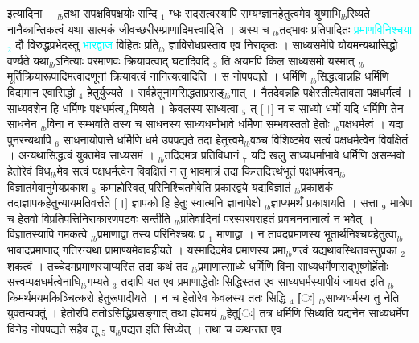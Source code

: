 \documentclass[article,12pt,a4paper]{memoir}%
\newcommand{\quotelemma}[1]{\textcolor{cyan}{#1}}
\begin{document}
	  
	  
	    \pstart  \leavevmode%
	    \hphantom{.}
	   इत्यादिना । {\tiny $_{lb}$}तथा सपक्षविपक्षयोः सन्दि {\tiny $_{1}$} ग्धः सदसत्वस्यापि सम्यग्ज्ञानहेतुत्वमेव युष्माभि{\tiny $_{lb}$}रिष्यते नानैकान्तिकत्वं यथा सात्मकं जीवच्छरीरम्प्राणादिमत्त्वादिति । अस्य च {\tiny $_{lb}$}तद्भावः प्रतिपादितः \quotelemma{प्रमाणविनिश्चया {\tiny $_{2}$}} दौ विरुद्धप्रभेदस्तु \quotelemma{भारद्वाज} विहितः प्रति{\tiny $_{lb}$} \leavevmode{} ज्ञाविरोधप्रस्ताव एव निराकृतः । साध्यसमेपि योयमन्यथासिद्धो वर्ण्यते यथा{\tiny $_{lb}$}ऽनित्याः परमाणवः क्रियावत्वाद् घटादिवदि {\tiny $_{3}$} ति अयमपि किल साध्यसमो यस्मात् {\tiny $_{lb}$}मूर्तिक्रियारूपादिमत्वादणूनां क्रियावत्वं नानित्यत्वादिति । स नोपपद्यते । धर्मिणि {\tiny $_{lb}$}सिद्धत्वान्नहि धर्मिणि विद्यमान एवासिद्धो {\tiny $_{4}$} हेतुर्युज्यते । सर्वहेतूनामसिद्धताप्रसङ्{\tiny $_{lb}$}गात् । नैतदेवन्नहि पक्षेस्तीत्येतावता पक्षधर्मत्वं । साध्यवशेन हि धर्मिणः पक्षधर्मत्व{\tiny $_{lb}$}मिष्यते । केवलस्य साध्यत्वा {\tiny $_{5}$} त् [।] न च साध्यो धर्मो यदि धर्मिणि तेन साधनेन {\tiny $_{lb}$}विना न सम्भवति तस्य च साधनस्य साध्यधर्माभावे धर्मिणा सम्भवस्ततो हेतोः {\tiny $_{lb}$}पक्षधर्मत्वं । यदा पुनरन्यथापि {\tiny $_{6}$} साधनायोपात्ते धर्मिणि धर्म उपपद्यते तदा हेतुत्त्वमे{\tiny $_{lb}$}वञ्च विशिष्टमेव सत्वं पक्षधर्मत्वेन विवक्षितं । अन्यथासिद्धत्वं युक्तमेव साध्यसमं । {\tiny $_{lb}$}तदिदमत्र प्रतिविधानं {\tiny $_{7}$} यदि खलु साध्यधर्माभावे धर्मिणि असम्भवो हेतोरेवं विध{\tiny $_{lb}$}मेव सत्वं पक्षधर्मत्वेन विवक्षितं न तु भावमात्रं तदा किन्तदित्त्थंभूतं पक्षधर्मत्वम{\tiny $_{lb}$}विज्ञातमेवानुमेयप्रकाश {\tiny $_{8}$} कमाहोस्वित् परिनिश्चितमेवेति प्रकारद्वये यद्यविज्ञातं {\tiny $_{lb}$}प्रकाशकं तदाज्ञापकहेतुन्यायमतिवर्त्तते [।] ज्ञापको हि हेतुः स्वात्मनि ज्ञानापेक्षो {\tiny $_{lb}$}ज्ञाप्यमर्थं प्रकाशयति । सत्ता {\tiny $_{9}$} \leavevmode{} मात्रेण च हेतवो विप्रतिपत्तिनिराकारणपटवः सन्तीति {\tiny $_{lb}$}प्रतिवादिनां परस्परपराहतं प्रवचननानात्वं न भवेत् । विज्ञातस्यापि गमकत्वे {\tiny $_{lb}$}प्रमाणाद्वा तस्य परिनिश्चयः प्र {\tiny $_{1}$} माणाद्वा । न तावदप्रमाणस्य भूतार्थनिश्चयहेतुत्वा{\tiny $_{lb}$}भावादप्रमाणाद् गतिरन्यथा प्रामाण्यमेवावहीयते । यस्मादिदमेव प्रमाणस्य प्रमा{\tiny $_{lb}$}णत्वं यद्यथावस्थितवस्तुप्रका {\tiny $_{2}$} शकत्वं । तच्चेदमप्रमाणस्याप्यस्ति तदा कथं तद {\tiny $_{lb}$}प्रमाणात्साध्ये धर्मिणि विना साध्यधर्मेणासद्भूष्णोर्हेतोः सत्त्वम्पक्षधर्मत्वेनाधि{\tiny $_{lb}$}गम्यते {\tiny $_{3}$} तदापि यत एव प्रमाणाद्धेतोः सिद्धिस्तत एव साध्यधर्मस्यापीयं जायत इति {\tiny $_{lb}$}किमर्थमयमकिञ्चित्करो हेतुरूपादीयते । न च हेतोरेव केवलस्य ततः सिद्धि {\tiny $_{4}$} [ः] {\tiny $_{lb}$}साध्यधर्मस्य तु नेति युक्तम्वक्तुं । हेतोरपि ततोऽसिद्धिप्रसङ्गात् तथा ह्येवमयं {\tiny $_{lb}$}हेतु[ः] तत्र धर्मिणि सिध्यति यद्यनेन साध्यधर्मेण विनेह नोपपद्यते सहैव तू {\tiny $_{5}$} प{\tiny $_{lb}$}पद्यत इति सिध्येत् । तथा च कथन्तत एव 
\end{document}
